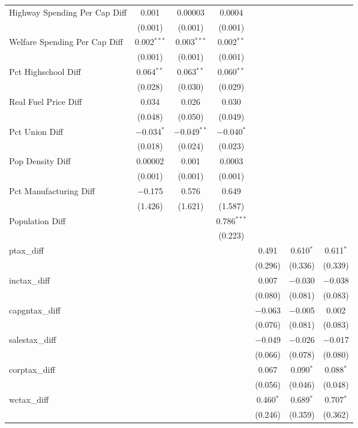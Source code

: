 \begin{table}[!htbp]
\begin{tabular}{@{\extracolsep{5pt}}lcccccc}
  Highway Spending Per Cap Diff & 0.001 & 0.00003 & 0.0004 &  &  &  \\ 
  & (0.001) & (0.001) & (0.001) &  &  &  \\ 
  Welfare Spending Per Cap Diff & 0.002$^{***}$ & 0.003$^{***}$ & 0.002$^{**}$ &  &  &  \\ 
  & (0.001) & (0.001) & (0.001) &  &  &  \\ 
  Pct Highschool Diff & 0.064$^{**}$ & 0.063$^{**}$ & 0.060$^{**}$ &  &  &  \\ 
  & (0.028) & (0.030) & (0.029) &  &  &  \\ 
  Real Fuel Price Diff & 0.034 & 0.026 & 0.030 &  &  &  \\ 
  & (0.048) & (0.050) & (0.049) &  &  &  \\ 
  Pct Union Diff & $-$0.034$^{*}$ & $-$0.049$^{**}$ & $-$0.040$^{*}$ &  &  &  \\ 
  & (0.018) & (0.024) & (0.023) &  &  &  \\ 
  Pop Density Diff & 0.00002 & 0.001 & 0.0003 &  &  &  \\ 
  & (0.001) & (0.001) & (0.001) &  &  &  \\ 
  Pct Manufacturing Diff & $-$0.175 & 0.576 & 0.649 &  &  &  \\ 
  & (1.426) & (1.621) & (1.587) &  &  &  \\ 
  Population Diff &  &  & 0.786$^{***}$ &  &  &  \\ 
  &  &  & (0.223) &  &  &  \\ 
  ptax\_diff &  &  &  & 0.491 & 0.610$^{*}$ & 0.611$^{*}$ \\ 
  &  &  &  & (0.296) & (0.336) & (0.339) \\ 
  inctax\_diff &  &  &  & 0.007 & $-$0.030 & $-$0.038 \\ 
  &  &  &  & (0.080) & (0.081) & (0.083) \\ 
  capgntax\_diff &  &  &  & $-$0.063 & $-$0.005 & 0.002 \\ 
  &  &  &  & (0.076) & (0.081) & (0.083) \\ 
  salestax\_diff &  &  &  & $-$0.049 & $-$0.026 & $-$0.017 \\ 
  &  &  &  & (0.066) & (0.078) & (0.080) \\ 
  corptax\_diff &  &  &  & 0.067 & 0.090$^{*}$ & 0.088$^{*}$ \\ 
  &  &  &  & (0.056) & (0.046) & (0.048) \\ 
  wctax\_diff &  &  &  & 0.460$^{*}$ & 0.689$^{*}$ & 0.707$^{*}$ \\ 
  &  &  &  & (0.246) & (0.359) & (0.362) \\ 

\end{tabular}
\end{table}
